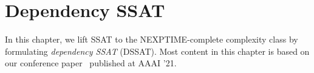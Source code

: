 \chapter{Dependency SSAT}
\label{chap:dependency-ssat}

In this chapter, we lift SSAT to the NEXPTIME-complete complexity class by formulating \textit{dependency SSAT} (DSSAT).
Most content in this chapter is based on our conference paper~\cite{LeeAAAI21DSSAT} published at AAAI '21.



